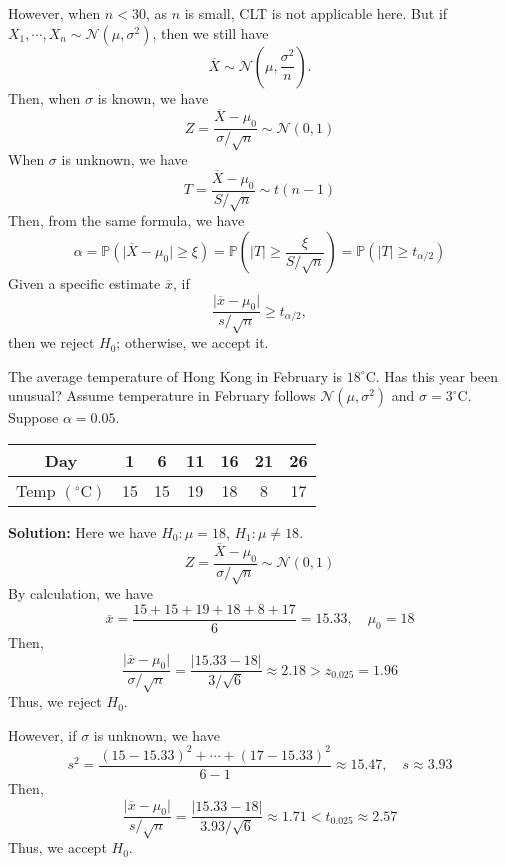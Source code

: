However, when \(n < 30\), as \(n\) is small, CLT is not applicable here. But if \(X_1, \cdots, X_n \sim \mathcal{N}(\mu, \sigma^2)\), then we still have 
\[
  \overline{X} \sim \mathcal{N} \left( \mu, \frac{\sigma^2}{n} \right).
\]
Then, when \(\sigma\) is known, we have 
\[
  Z = \dfrac{\overline{X} - \mu_0}{\sigma / \sqrt{n}} \sim \mathcal{N}(0, 1)
\]
When \(\sigma\) is unknown, we have 
\[
  T = \dfrac{\overline{X} - \mu_0}{S / \sqrt{n}} \sim t(n - 1)
\]
Then, from the same formula, we have 
\[
  \alpha = \mathbb{P} \left( \vert \overline{X} - \mu_0 \vert \geq \xi \right) = \mathbb{P} \left( \vert T \vert \geq \frac{\xi}{S / \sqrt{n}} \right) = \mathbb{P} \left( \vert T \vert \geq t_{\alpha / 2} \right)
\]
Given a specific estimate \(\overline{x}\), if 
\[
  \frac{\vert \overline{x} - \mu_0 \vert}{s / \sqrt{n}} \geq t_{\alpha / 2},
\]
then we reject \(H_0\); otherwise, we accept it.

\begin{eg}
  The average temperature of Hong Kong in February is \(18^\circ\text{C}\). Has this year been unusual? Assume temperature in February follows \(\mathcal{N}(\mu, \sigma^2)\) and \(\sigma = 3^\circ\text{C}\). Suppose \(\alpha = 0.05\). 
  \begin{table}[H]
    \centering
    \begin{tabular}{c|c|c|c|c|c|c}
      \toprule
      Day & 1 & 6 & 11 & 16 & 21 & 26 \\
      \midrule
      Temp \((^\circ\text{C})\) & 15 & 15 & 19 & 18 & 8 & 17 \\
      \bottomrule
    \end{tabular}
  \end{table}

  \textbf{Solution:}  
  Here we have \(H_0: \mu = 18\), \(H_1: \mu \neq 18\).  
  \[
    Z = \dfrac{\overline{X} - \mu_0}{\sigma / \sqrt{n}} \sim \mathcal{N}(0, 1)
  \]
  By calculation, we have
  \[
    \overline{x} = \dfrac{15 + 15 + 19 + 18 + 8 + 17}{6} = 15.33, \quad \mu_0 = 18
  \]
  Then,
  \[
    \dfrac{\vert \overline{x} - \mu_0 \vert}{\sigma / \sqrt{n}} = \dfrac{\vert 15.33 - 18 \vert}{3 / \sqrt{6}} \approx 2.18 > z_{0.025} = 1.96
  \]
  Thus, we reject \(H_0\).

  However, if \(\sigma\) is unknown, we have
  \[
    s^2 = \dfrac{(15 - 15.33)^2 + \cdots + (17 - 15.33)^2}{6 - 1} \approx 15.47, \quad s \approx 3.93
  \]
  Then,
  \[
    \dfrac{\vert \overline{x} - \mu_0 \vert}{s / \sqrt{n}} = \dfrac{\vert 15.33 - 18 \vert}{3.93 / \sqrt{6}} \approx 1.71 < t_{0.025} \approx 2.57
  \]
  Thus, we accept \(H_0\).
\end{eg}

